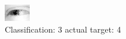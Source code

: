 \begin{figure}[h!]
\begin{center}
\includegraphics[width=0.60\columnwidth]{figures/ID2527_class_3_target_4.png}
\end{center}
\caption{ Classification: 3 actual target: 4}
\label{fig:ID2527_class_3_target_4}
\end{figure}
